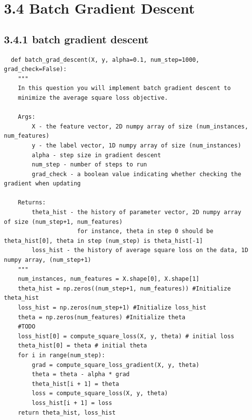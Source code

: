 \documentclass{article}
\begin{document}
\section{3.4 Batch Gradient Descent}
\subsection{3.4.1 batch gradient descent}
\begin{verbatim}
  def batch_grad_descent(X, y, alpha=0.1, num_step=1000, grad_check=False):
    """
    In this question you will implement batch gradient descent to
    minimize the average square loss objective.

    Args:
        X - the feature vector, 2D numpy array of size (num_instances, num_features)
        y - the label vector, 1D numpy array of size (num_instances)
        alpha - step size in gradient descent
        num_step - number of steps to run
        grad_check - a boolean value indicating whether checking the gradient when updating

    Returns:
        theta_hist - the history of parameter vector, 2D numpy array of size (num_step+1, num_features)
                     for instance, theta in step 0 should be theta_hist[0], theta in step (num_step) is theta_hist[-1]
        loss_hist - the history of average square loss on the data, 1D numpy array, (num_step+1)
    """
    num_instances, num_features = X.shape[0], X.shape[1]
    theta_hist = np.zeros((num_step+1, num_features)) #Initialize theta_hist
    loss_hist = np.zeros(num_step+1) #Initialize loss_hist
    theta = np.zeros(num_features) #Initialize theta
    #TODO
    loss_hist[0] = compute_square_loss(X, y, theta) # initial loss
    theta_hist[0] = theta # initial theta
    for i in range(num_step):
        grad = compute_square_loss_gradient(X, y, theta)
        theta = theta - alpha * grad
        theta_hist[i + 1] = theta
        loss = compute_square_loss(X, y, theta)
        loss_hist[i + 1] = loss
    return theta_hist, loss_hist
\end{verbatim}
\end{document}
